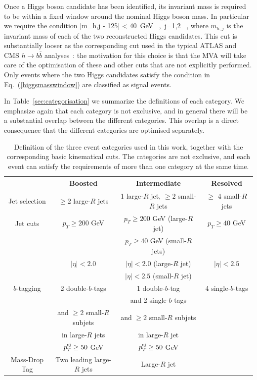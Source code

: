 Once a Higgs boson candidate has been identified,
its invariant mass is required to be within a fixed window
around the nominal Higgs boson mass.
%
In particular we require the condition
\be
\label{higgsmasswindow}
|m_{h,j} - 125| < 40~{\rm GeV} \, ,\, j=1,2 \, ,
\ee
where $m_{h,j}$ is the invariant mass of each of the two reconstructed  Higgs candidates.
%
This cut is substantially looser as the corresponding
cut used in the typical ATLAS and CMS $h\to b\bar{b}$
analyses~\cite{Aad:2012gxa,Chatrchyan:2013zna}: the motivation
for this choice is that the MVA will take care of the optimisation of these
and other cuts that are not explicitly performed.
%
Only events where the two Higgs candidates satisfy the
condition in Eq.~(\ref{higgsmasswindow}) are classified as signal events.


In Table~\ref{sec:categorisation} we summarize the definitions of each
category.
%
We emphasize again that each category is not exclusive,
and in general there will be a substantial overlap
between the different categories.
%
This overlap is a direct consequence that
the different categories are optimised separately.


\begin{table}[h]
  \centering
  \small
  \begin{tabular}{c|c|c|c}
    \hline
    &  Boosted  &  Intermediate  &  Resolved \\
    \hline
    \hline 
    Jet selection  &  $\ge 2$ large-$R$ jets  & 1 large-$R$ jet, $\ge 2$ small-$R$
    jets  &  $\ge$ 4 small-$R$ jets \\[0.2cm]
    \hline
    Jet cuts  & $p_T \ge 200$ GeV   &  $p_T \ge 200$ GeV (large-$R$ jet)
    &  $p_T \ge 40$ GeV \\
    &  & $p_T \ge 40$ GeV (small-$R$ jets)   &    \\
    &   $|\eta|<2.0$  & $|\eta|<2.0$ (large-$R$ jet) & $|\eta|<2.5$ \\
    &        & $|\eta|<2.5$ (small-$R$ jet)  &  \\[0.2cm]
    \hline
    $b$-tagging  & 2 double-$b$-tags  & 1 double-$b$-tag & 4 single-$b$-tags \\
    &  & and 2 single-$b$-tags  &  \\
    & and $\ge 2$ small-$R$ subjets  &  and $\ge 2$ small-$R$ subjets  &  \\
     &  in large-$R$ jets  &  in large-$R$ jet &  \\
    &  $p_T^{\rm sj}\ge 50$ GeV & $p_T^{\rm sj}\ge 50$ GeV   &  \\[0.2cm]
    \hline
    Mass-Drop Tag  &  Two leading large-$R$ jets  &  Large-$R$ jet &   \\
    \hline
    \end{tabular}
  \caption{\small Definition of the three event categories used in this
    work, together with the corresponding basic kinematical cuts.
    The categories are not exclusive, and each event can satisfy the
    requirements of more than one category at the same time.  
\label{sec:categorisationTable}
  }
\end{table}

